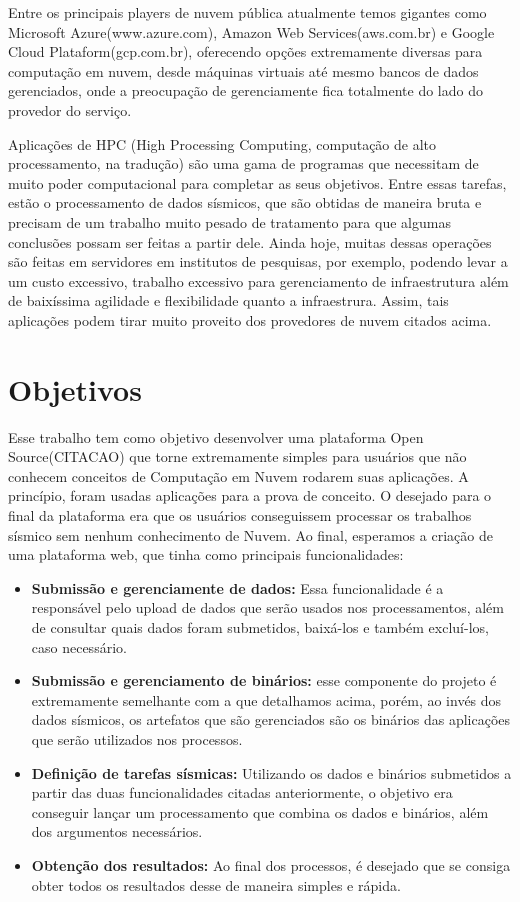 \documentclass[11pt,twoside]{article}
\begin{document}
Entre os principais players de nuvem pública atualmente temos gigantes como Microsoft Azure(www.azure.com), Amazon Web Services(aws.com.br) e Google Cloud Plataform(gcp.com.br), 
oferecendo opções extremamente diversas para computação em nuvem, desde máquinas virtuais até mesmo bancos de dados gerenciados, onde a preocupação de gerenciamente fica totalmente
do lado do provedor do serviço.

Aplicações de HPC (High Processing Computing, computação de alto processamento, na tradução) são uma gama de programas que necessitam de muito poder computacional para 
completar as seus objetivos. Entre essas tarefas, estão o processamento de dados sísmicos, que são obtidas de maneira bruta e precisam de um trabalho muito pesado de tratamento
para que algumas conclusões possam ser feitas a partir dele. Ainda hoje, muitas dessas operações são feitas em servidores em institutos de pesquisas, por exemplo, podendo levar
a um custo excessivo, trabalho excessivo para gerenciamento de infraestrutura além de baixíssima agilidade e flexibilidade quanto a infraestrura. Assim, tais aplicações podem 
tirar muito proveito dos provedores de nuvem citados acima.

\section{Objetivos}
Esse trabalho tem como objetivo desenvolver uma plataforma Open Source(CITACAO) que torne extremamente simples para usuários que não conhecem conceitos de Computação em Nuvem rodarem suas aplicações.
A princípio, foram usadas aplicações para a prova de conceito. O desejado para o final da plataforma era que os usuários conseguissem processar os trabalhos sísmico sem nenhum conhecimento de Nuvem.  
Ao final, esperamos a criação de uma plataforma web, que tinha como principais funcionalidades:

\begin{itemize}
  \item \textbf{Submissão e gerenciamente de dados:} Essa funcionalidade é a responsável pelo upload de dados que serão usados nos processamentos, além de consultar quais dados foram submetidos, baixá-los e também
  excluí-los, caso necessário. 
  \item \textbf{Submissão e gerenciamento de binários:} esse componente do projeto é extremamente semelhante com a que detalhamos acima, porém, ao invés dos dados sísmicos, os artefatos que são gerenciados são os 
  binários das aplicações que serão utilizados nos processos.
  \item \textbf{Definição de tarefas sísmicas:} Utilizando os dados e binários submetidos a partir das duas funcionalidades citadas anteriormente, o objetivo era conseguir lançar um processamento que combina os dados e 
  binários, além dos argumentos necessários.
  \item \textbf{Obtenção dos resultados:} Ao final dos processos, é desejado que se consiga obter todos os resultados desse de maneira simples e rápida.
\end{itemize}
\end{document}
